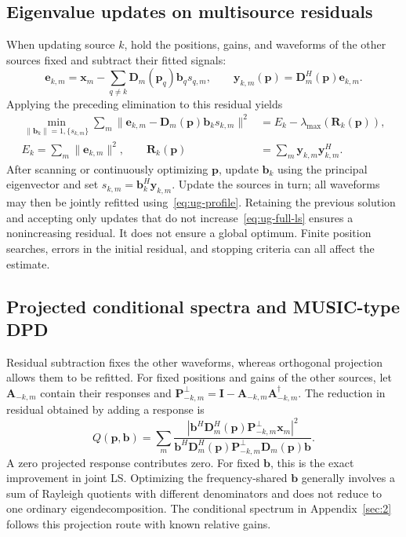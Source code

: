 \subsection{Eigenvalue updates on multisource residuals}\label{sec:ug-block}
When updating source $k$, hold the positions, gains, and waveforms of the other sources fixed and subtract their fitted signals:
\begin{equation}\label{eq:ug-residual}
\mathbf e_{k,m}=\mathbf x_m-
\sum_{q\ne k}\mathbf D_m(\mathbf p_q)\mathbf b_qs_{q,m},\qquad
\mathbf y_{k,m}(\mathbf p)=\mathbf D_m^H(\mathbf p)\mathbf e_{k,m}.
\end{equation}
Applying the preceding elimination to this residual yields
\begin{equation}\label{eq:ug-block-eigen}
\begin{aligned}
\min_{\|\mathbf b_k\|=1,\{s_{k,m}\}}
\sum_m\|\mathbf e_{k,m}-\mathbf D_m(\mathbf p)\mathbf b_ks_{k,m}\|^2
&=E_k-\lambda_{\max}(\mathbf R_k(\mathbf p)),\\
E_k=\sum_m\|\mathbf e_{k,m}\|^2,\qquad
\mathbf R_k(\mathbf p)&=\sum_m\mathbf y_{k,m}\mathbf y_{k,m}^H.
\end{aligned}
\end{equation}
After scanning or continuously optimizing $\mathbf p$, update $\mathbf b_k$ using the principal eigenvector and set $s_{k,m}=\mathbf b_k^H\mathbf y_{k,m}$. Update the sources in turn; all waveforms may then be jointly refitted using~\eqref{eq:ug-profile}. Retaining the previous solution and accepting only updates that do not increase~\eqref{eq:ug-full-ls} ensures a nonincreasing residual. It does not ensure a global optimum. Finite position searches, errors in the initial residual, and stopping criteria can all affect the estimate.

\subsection{Projected conditional spectra and MUSIC-type DPD}\label{sec:ug-spectra}
Residual subtraction fixes the other waveforms, whereas orthogonal projection allows them to be refitted. For fixed positions and gains of the other sources, let $\mathbf A_{-k,m}$ contain their responses and $\mathbf P_{-k,m}^\perp=\mathbf I-\mathbf A_{-k,m}\mathbf A_{-k,m}^\dagger$. The reduction in residual obtained by adding a response is
\begin{equation}\label{eq:ug-projection}
Q(\mathbf p,\mathbf b)=\sum_m
\frac{|\mathbf b^H\mathbf D_m^H(\mathbf p)\mathbf P_{-k,m}^\perp\mathbf x_m|^2}
{\mathbf b^H\mathbf D_m^H(\mathbf p)\mathbf P_{-k,m}^\perp\mathbf D_m(\mathbf p)\mathbf b}.
\end{equation}
A zero projected response contributes zero. For fixed $\mathbf b$, this is the exact improvement in joint LS. Optimizing the frequency-shared $\mathbf b$ generally involves a sum of Rayleigh quotients with different denominators and does not reduce to one ordinary eigendecomposition. The conditional spectrum in Appendix~\ref{sec:2} follows this projection route with known relative gains.

